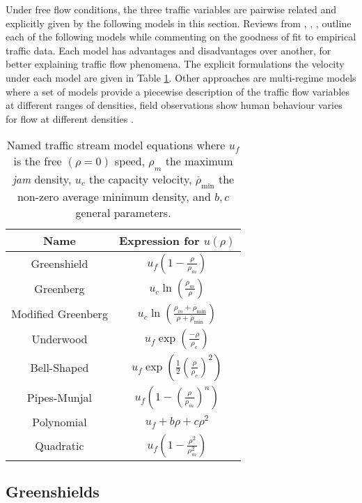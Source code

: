 	Under free flow conditions, the three traffic variables are pairwise related and explicitly given by the following models in this section. Reviews from \cite{ArdekaniGhandehariNepal11}, \cite{TiwariMarsani14}, \cite{LuMeng13}, \cite{Tom14} outline each of the following models while commenting on the goodness of fit to empirical traffic data. Each model has advantages and disadvantages over another, for better explaining traffic flow phenomena. The explicit formulations the velocity under each model are given in Table \ref{tab:streammodels}. Other approaches are multi-regime models where a set of models provide a piecewise description of the traffic flow variables at different ranges of densities, field observations show human behaviour varies for flow at different densities \cite{Tom14}.

	\begin{table}
		\renewcommand{\arraystretch}{1.8}
		\centering
		\caption[Stream model expressions]{Named traffic stream model equations where $u_f$ is the free $(\rho=0)$ speed, $\rho_m$ the maximum \emph{jam} density, $u_c$ the capacity velocity, $\overline\rho_{\min}$ the non-zero average minimum density, and $b,c$ general parameters.}
		\label{tab:streammodels}
		\begin{tabular}{|c c|} 
			\hline
			Name & Expression for $u\left(\rho\right)$ \\
			\hline
			Greenshield & $u_f\left(1-\frac{\rho}{\rho_m}\right)$ \\
			Greenberg & $u_c\ln\left(\frac{\rho_m}{\rho}\right)$ \\
			Modified Greenberg & $u_c\ln\left(\frac{\rho_m+\overline\rho_{\min}}{\rho+\overline\rho_{\min}}\right)$ \\
			Underwood & $u_f\exp\left(\frac{-\rho}{\rho_c}\right)$ \\
			Bell-Shaped & $u_f\exp\left(\frac{1}{2}\left(\frac{\rho}{\rho_c}\right)^2\right)$ \\
			Pipes-Munjal & $u_f\left(1-\left(\frac{\rho}{\rho_m}\right)^n\right)$ \\
			Polynomial & $u_f+b\rho+c\rho^2$ \\
			Quadratic & $u_f\left(1-\frac{\rho^2}{\rho^2_m}\right)$ \\
			\hline
		\end{tabular}
		\renewcommand{\arraystretch}{1}
	\end{table}

\subsection*{Greenshields}

